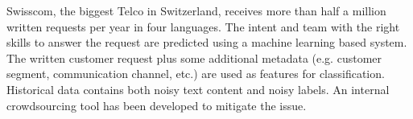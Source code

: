 Swisscom, the biggest Telco in Switzerland, receives more than half a million written requests per year in four languages. The intent and team with the right skills to answer the request are predicted using a machine learning based system. The written customer request plus some additional metadata (e.g. customer segment, communication channel, etc.) are used as features for classification. Historical data contains both noisy text content and noisy labels. An internal crowdsourcing tool has been developed to mitigate the issue.
